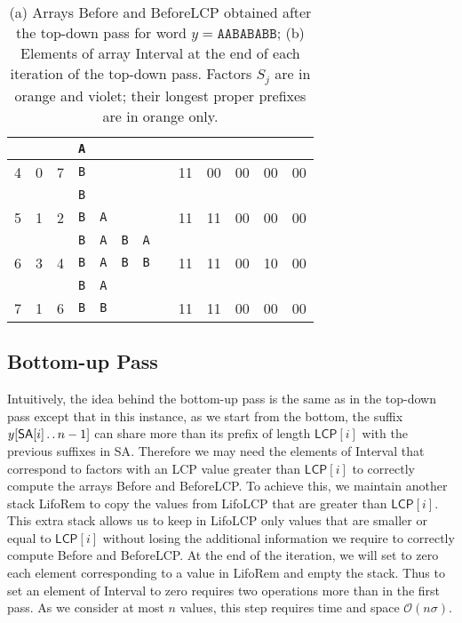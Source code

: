 \documentclass{llncs}
\def\dd{\mathinner{.\,.}}
\newcommand{\cO}{\mathcal{O}}
\newcommand{\SA}{\textsf{SA}}
\newcommand{\LCP}{\textsf{LCP}}
\newcommand{\Before}{\textsf{Before}}
\newcommand{\BeforeLCP}{\textsf{BeforeLCP}}
\newcommand{\Interval}{\textsf{Interval}}
\newcommand{\Lifolcp}{\textsf{LifoLCP}}
\newcommand{\Liforem}{\textsf{LifoRem}}
\begin{document}
\begin{table}[!t]
\begin{center}
{{\begin{tabular}{|*{3}{c|}*{4}{c}*{6}{c|}}
 & & &\cellcolor{Thistle}\texttt{A}& & & & & & & & & \\ \hline
4&0&7&\cellcolor{Thistle}\texttt{B}& & & & &11&00&00&00&00\\ \hline
 & & &\cellcolor{Apricot}\texttt{B}&\cellcolor{Thistle}& & & & & & & &\\ \hline
5&1&2&\cellcolor{Apricot}\texttt{B}&\cellcolor{Thistle}\texttt{A}& & & &11&11&00&00&00\\ \hline
 & & &\cellcolor{Apricot}\texttt{B}&\cellcolor{Apricot}\texttt{A}&\cellcolor{Apricot}\texttt{B}&\cellcolor{Thistle}\texttt{A}& & & & & &\\ \hline
6&3&4&\cellcolor{Apricot}\texttt{B}&\cellcolor{Apricot}\texttt{A}&\cellcolor{Apricot}\texttt{B}&\cellcolor{Thistle}\texttt{B}& &11&11&00&10&00\\ \hline
 & & &\cellcolor{Apricot}\texttt{B}&\cellcolor{Thistle}\texttt{A}& & & & & & & &\\ \hline
7&1&6&\cellcolor{Apricot}\texttt{B}&\cellcolor{Thistle}\texttt{B}& & & &11&11&00&00&00\\ \hline
\end{tabular}
}
}
\end{center}
  \caption{(a) Arrays \Before{} and \BeforeLCP{} obtained after the top-down pass for word $y=\texttt{AABABABB}$; (b) Elements of array \Interval{}
at the end of each iteration of the top-down pass. Factors $S_{j}$ are in orange and violet; their longest proper prefixes are in orange only.}
\label{tab:td}
\end{table}
\subsection{Bottom-up Pass}
  Intuitively, the idea behind the bottom-up pass is the same as in the top-down pass except that in this instance, as we start from the bottom, the suffix $y[\SA{}[i]\dd n-1]$ can share more than its prefix of length $\LCP{}[i]$ with the previous suffixes in \SA{}.
  Therefore we may need the elements of \Interval{} that correspond to factors with an \LCP{} value greater than $\LCP{}[i]$ to correctly compute the arrays \Before{} and \BeforeLCP{}.
  To achieve this, we maintain another stack \Liforem{} to copy the values from \Lifolcp{} that are greater than $\LCP{}[i]$.
  This extra stack allows us to keep in \Lifolcp{} only values that are smaller or equal to $\LCP[i]$ without losing the additional information we require to correctly compute \Before{} and \BeforeLCP{}.
  At the end of the iteration, we will set to zero each element corresponding to a value in \Liforem{} and empty the stack.
  Thus to set an element of \Interval{} to zero requires two operations more than in the first pass.
  As we consider at most $n$ values, this step requires time and space $\cO(n\sigma)$.
  
\end{document}
